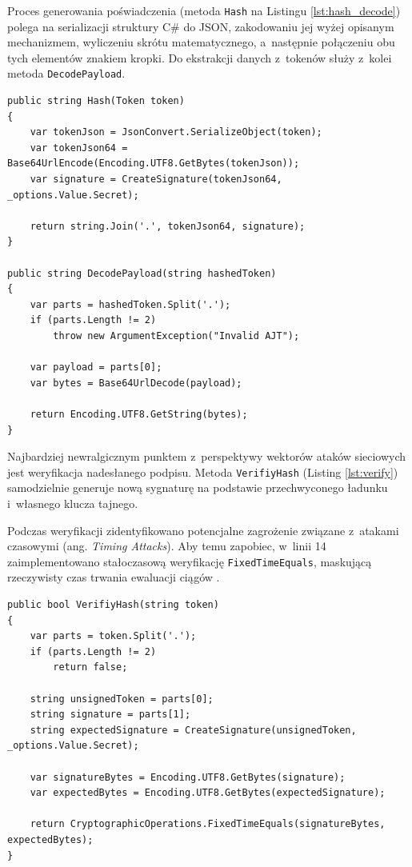 \documentclass{SGGW-thesis}
\begin{document}
\clearpage
Proces generowania poświadczenia (metoda \texttt{Hash} na Listingu \ref{lst:hash_decode}) polega na serializacji struktury C\# do JSON, zakodowaniu jej wyżej opisanym mechanizmem, wyliczeniu skrótu matematycznego, a~następnie połączeniu obu tych elementów znakiem kropki. Do ekstrakcji danych z~tokenów służy z~kolei metoda \texttt{DecodePayload}.

\begin{lstlisting}[caption={Publiczny interfejs generowania i dekodowania łańcucha tokenu}, label={lst:hash_decode}]
public string Hash(Token token)
{
    var tokenJson = JsonConvert.SerializeObject(token);
    var tokenJson64 = Base64UrlEncode(Encoding.UTF8.GetBytes(tokenJson));
    var signature = CreateSignature(tokenJson64, _options.Value.Secret);
    
    return string.Join('.', tokenJson64, signature);
}

public string DecodePayload(string hashedToken)
{
    var parts = hashedToken.Split('.');
    if (parts.Length != 2)
        throw new ArgumentException("Invalid AJT");

    var payload = parts[0];
    var bytes = Base64UrlDecode(payload);
    
    return Encoding.UTF8.GetString(bytes);
}
\end{lstlisting}

Najbardziej newralgicznym punktem z~perspektywy wektorów ataków sieciowych jest weryfikacja nadesłanego podpisu. Metoda \texttt{VerifiyHash} (Listing \ref{lst:verify}) samodzielnie generuje nową sygnaturę na podstawie przechwyconego ładunku i~własnego klucza tajnego.

Podczas weryfikacji zidentyfikowano potencjalne zagrożenie związane z~atakami czasowymi (ang. \textit{Timing Attacks}). Aby temu zapobiec, w~linii 14 zaimplementowano stałoczasową weryfikację \texttt{FixedTimeEquals}, maskującą rzeczywisty czas trwania ewaluacji ciągów \cite{schneier}.

\clearpage
\begin{lstlisting}[caption={Stałoczasowa weryfikacja sumy kontrolnej zapobiegająca atakom czasowym}, label={lst:verify}]    
public bool VerifiyHash(string token)
{
    var parts = token.Split('.');
    if (parts.Length != 2)
        return false;

    string unsignedToken = parts[0];
    string signature = parts[1];
    string expectedSignature = CreateSignature(unsignedToken, _options.Value.Secret);

    var signatureBytes = Encoding.UTF8.GetBytes(signature);
    var expectedBytes = Encoding.UTF8.GetBytes(expectedSignature);

    return CryptographicOperations.FixedTimeEquals(signatureBytes, expectedBytes);
}
\end{lstlisting}
\end{document}
